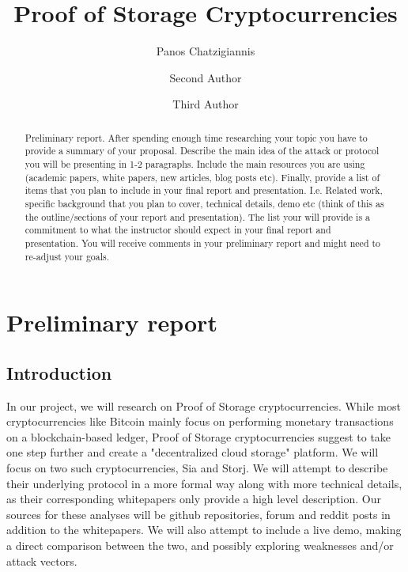 \documentclass[runningheads]{llncs}
\begin{document}
%
\title{Proof of Storage Cryptocurrencies}
%
%
\author{Panos Chatzigiannis \and
Second Author \and
Third Author}
%
%
%
\maketitle              %
%
\begin{abstract}
Preliminary report. After spending enough time researching your topic you have to provide a summary of your proposal. Describe the main idea of the attack or protocol you will be presenting in 1-2 paragraphs. Include the main resources you are using (academic papers, white papers, new articles, blog posts etc). Finally, provide a list of items that you plan to include in your final report and presentation. I.e. Related work, specific background that you plan to cover, technical details, demo etc (think of this as the outline/sections of your report and presentation). The list your will provide is a commitment to what the instructor should expect in your final report and presentation. You will receive comments in your preliminary report and might need to re-adjust your goals.

\end{abstract}
%
%
%
\section{Preliminary report}
\subsection{Introduction}

In our project, we will research on Proof of Storage cryptocurrencies. While most cryptocurrencies like Bitcoin \cite{satoshi_white} mainly focus on performing monetary transactions on a blockchain-based ledger, Proof of Storage cryptocurrencies suggest to take one step further and create a "decentralized cloud storage" platform. We will focus on two such cryptocurrencies, Sia and Storj. We will attempt to describe their underlying protocol in a more formal way along with more technical details, as their corresponding whitepapers only provide a high level description. Our sources for these analyses will be github repositories, forum and reddit posts in addition to the whitepapers. We will also attempt to include a live demo, making a direct comparison between the two, and possibly exploring weaknesses and/or attack vectors.
\end{document}
